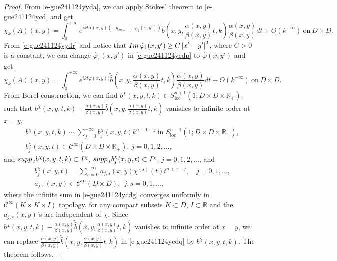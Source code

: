 \documentclass[12pt]{amsart}
\theoremstyle{definition}
\theoremstyle{named}
\numberwithin{equation}{subsection}
\newcommand{\R}{\mathbb{R}}
\newcommand{\Td}{\widetilde}
\newcommand{\abs}[1]{\left\vert#1\right\vert}
\def\cC{\mathscr{C}}
\begin{document}
\begin{proof}
 From \eqref{e-gue241124yyda}, we can apply Stokes' theorem to \eqref{e-gue241124ycd} and get 
\begin{equation}\label{e-gue241124ycdp}
\chi_k(A)(x,y)=\int_0^{+\infty} 
e^{ikt\alpha(x,y)(-y_{2n+1}+\hat\varphi_1(x,y'))}\Td{\hat b}(x,y,\frac{\alpha(x,y)}{\beta(x,y)}t,k)\frac{\alpha(x,y)}{\beta(x,y)}dt+O\left(k^{-\infty}\right)~\text{on}~D\times D.
\end{equation}
 From \eqref{e-gue241124yydr} and notice that ${\rm Im\,}\hat\varphi_1(x,y')\geq C\abs{x'-y'}^2$, where $C>0$ is a constant, we can change $\hat\varphi_1(x,y')$ in \eqref{e-gue241124ycdp} to $\hat\varphi(x,y')$ and get 
 \begin{equation}\label{e-gue241124ycdq}
\chi_k(A)(x,y)=\int_0^{+\infty} 
e^{ikt\varphi(x,y))}\Td{\hat b}(x,y,\frac{\alpha(x,y)}{\beta(x,y)}t,k)\frac{\alpha(x,y)}{\beta(x,y)}dt+O\left(k^{-\infty}\right)~\text{on}~D\times D.
\end{equation}
 From Borel construction, we can find $ b^\chi(x,y,t,k)\in S^{n+1}_{\mathrm{loc}}
(1;D\times D\times{\R}_+)$, such that 
$b^\chi(x,y,t,k)-\frac{\alpha(x,y)}{\beta(x,y)}\Td{\hat b}(x,y,\frac{\alpha(x,y)}{\beta(x,y)}t,k)$ vanishes to infinite order at $x=y$, 
\begin{equation}\label{e-gue241124ycdIg}
\begin{split}
&b^\chi(x,y,t,k)\sim\sum_{j=0}^{+\infty}b^\chi_{j}(x,y,t)k^{n+1-j}~
\text{in $S^{n+1}_{\mathrm{loc}}(1;D\times D\times{\R}_+)$},\\
&b^\chi_j(x,y,t)\in\mathscr{C}^\infty(D\times D\times{\R}_+),~j=0,1,2,\ldots,
\end{split}
\end{equation}
and ${\rm supp\,}_t b^\chi(x,y,t,k)\subset I^\chi$, ${\rm supp\,}_t b^\chi_j(x,y,t)\subset I^\chi$, $j=0,1,2,\ldots$, and \begin{equation}\label{e-gue241124ycdg}
\begin{split}
    &b^\chi_j(x,y,t)=\sum^{+\infty}_{s=0}a_{j,s}(x,y)\chi^{(s)}(t)t^{n+s-j},\quad j=0,1,\ldots,\\
     &a_{j,s}(x,y)\in\cC^\infty(D\times D),\ \ j,s=0,1,\ldots,
\end{split}\end{equation}
where the infinite sum in \eqref{e-gue241124ycdg} converges uniformly in $\cC^{\infty}(K\times K\times I)$ topology, for any compact subsets $K\subset D$, \(I\subset \R\) and the \(a_{j,s}(x,y)\)'s are independent of \(\chi\). Since $b^\chi(x,y,t,k)-\frac{\alpha(x,y)}{\beta(x,y)}\Td{\hat b}(x,y,\frac{\alpha(x,y)}{\beta(x,y)}t,k)$ vanishes to infinite order at $x=y$, we can replace $\frac{\alpha(x,y)}{\beta(x,y)}\Td{\hat b}(x,y,\frac{\alpha(x,y)}{\beta(x,y)}t,k)$ in \eqref{e-gue241124ycdq} by $b^\chi(x,y,t,k)$. The theorem follows. 
 \end{proof}
\end{document}
